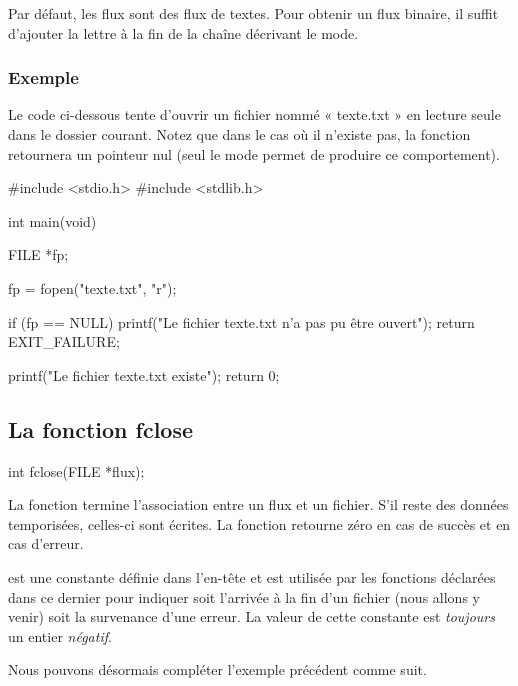 Par défaut, les flux sont des flux de textes. Pour obtenir un flux
binaire, il suffit d'ajouter la lettre  à la fin de la chaîne
décrivant le mode.

\subsubsection{Exemple}
\label{exemple-21}

Le code ci-dessous tente d'ouvrir un fichier nommé « texte.txt » en
lecture seule dans le dossier courant. Notez que dans le cas où il
n'existe pas, la fonction  retournera un pointeur nul
(seul le mode  permet de produire ce comportement).

\begin{C}
#include <stdio.h>
#include <stdlib.h>


int main(void)
{
    FILE *fp;

    fp = fopen("texte.txt", "r");

    if (fp == NULL)
    {
        printf("Le fichier texte.txt n'a pas pu être ouvert\n");
        return EXIT_FAILURE;
    }

    printf("Le fichier texte.txt existe\n");
    return 0;
}
\end{C}

\subsection{La fonction fclose}
\label{la-fonction-fclose}

\begin{C}
int fclose(FILE *flux);
\end{C}

La fonction  termine l'association entre un flux et un
fichier. S'il reste des données temporisées, celles-ci sont écrites. La
fonction retourne zéro en cas de succès et  en cas d'erreur.

\begin{infobox} 
  est une constante
définie dans l'en-tête  et est
utilisée par les fonctions déclarées dans ce dernier pour indiquer soit
l'arrivée à la fin d'un fichier (nous allons y venir) soit la survenance
d'une erreur. La valeur de cette constante est \emph{toujours} un entier
\emph{négatif}.
\end{infobox}

Nous pouvons désormais compléter l'exemple précédent comme suit.

